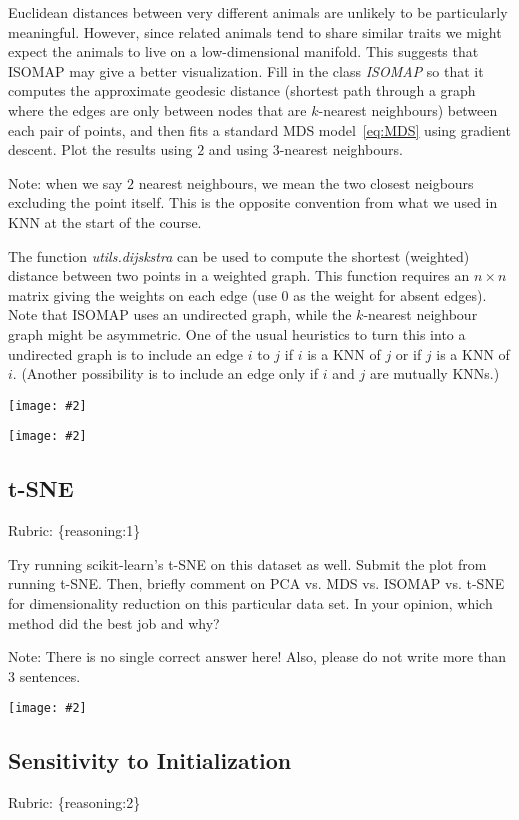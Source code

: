 \documentclass{article}
\def\rubric#1{\gre{Rubric: \{#1\}}}{}
\def\blu#1{{\color{blu}#1}}
\def\gre#1{{\color{gre}#1}}
\newcommand{\centerfig}[2]{\begin{center}\texttt{[image: \#2]}\end{center}}
\begin{document}
Euclidean distances between very different animals are unlikely to be particularly meaningful.
However, since related animals tend to share similar traits we might expect the animals to live on a low-dimensional manifold.
This suggests that ISOMAP may give a better visualization.
Fill in the class \emph{ISOMAP} so that it computes the approximate geodesic distance
(shortest path through a graph where the edges are only between nodes that are $k$-nearest neighbours) between each pair of points,
and then fits a standard MDS model~\eqref{eq:MDS} using gradient descent. \blu{Plot the results using $2$ and using $3$-nearest neighbours}.

Note: when we say $2$ nearest neighbours, we mean the two closest neigbours excluding the point itself. This is the opposite convention from what we used in KNN at the start of the course.

The function \emph{utils.dijskstra} can be used to compute the shortest (weighted) distance between two points in a weighted graph.
This function requires an $n \times n$ matrix giving the weights on each edge (use $0$ as the weight for absent edges).
Note that ISOMAP uses an undirected graph, while the $k$-nearest neighbour graph might be asymmetric.
One of the usual heuristics to turn this into a undirected graph is to include an edge $i$ to $j$ if $i$ is a KNN of $j$ or if $j$ is a KNN of $i$.
(Another possibility is to include an edge only if $i$ and $j$ are mutually KNNs.)
\centerfig{.5}{../figs/ISOMAP2_animals.png}
\centerfig{.5}{../figs/ISOMAP3_animals.png}

\subsection{t-SNE}
\rubric{reasoning:1}

Try running scikit-learn's t-SNE on this dataset as well. \blu{Submit the plot from running t-SNE. Then, briefly comment on PCA vs. MDS vs. ISOMAP vs. t-SNE for dimensionality reduction on this particular data set. In your opinion, which method did the best job and why?}

Note: There is no single correct answer here! Also, please do not write more than 3 sentences.
\centerfig{.5}{../figs/tsne_2_features.png}

\subsection{Sensitivity to Initialization}
\rubric{reasoning:2}
\end{document}
